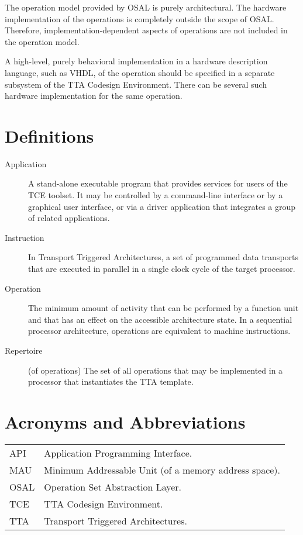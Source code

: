 \documentclass[twoside]{tce}
\begin{document}
The operation model provided by OSAL is purely architectural.  The hardware
implementation of the operations is completely outside the scope of OSAL.
Therefore, implementation-dependent aspects of operations are not included
in the operation model.

A high-level, purely behavioral implementation in a hardware description
language, such as VHDL, of the operation should be specified in a separate
subsystem of the TTA Codesign Environment.  There can be several such
hardware implementation for the same operation.

\section{Definitions}

\begin{description}
\item[Application]%
  A stand-alone executable program that provides services for users of the
  TCE toolset. It may be controlled by a command-line interface or by a
  graphical user interface, or via a driver application that integrates a
  group of related applications.
\item[Instruction] %
  In Transport Triggered Architectures, a set of programmed data transports
  that are executed in parallel in a single clock cycle of the target
  processor.
\item[Operation] %
  The minimum amount of activity that can be performed by a function unit
  and that has an effect on the accessible architecture state.  In a
  sequential processor architecture, operations are equivalent to machine
  instructions.
\item[Repertoire] (of operations) %
  The set of all operations that may be implemented in a processor that
  instantiates the TTA template.
\end{description}

\section{Acronyms and Abbreviations}

\begin{center}
\begin{longtable}{p{}p{}}
API   & Application Programming Interface. \\
MAU   & Minimum Addressable Unit (of a memory address space). \\
OSAL  & Operation Set Abstraction Layer.  \\
TCE   & TTA Codesign Environment. \\
TTA   & Transport Triggered Architectures. \\
\end{longtable}
\end{center}
\end{document}
